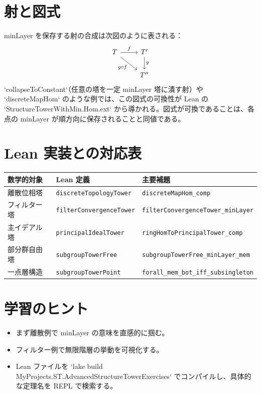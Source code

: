 \documentclass[a4paper]{ltjsarticle}
\theoremstyle{definition}
\theoremstyle{plain}
\theoremstyle{remark}
\begin{document}
\section{射と図式}
minLayer を保存する射の合成は次図のように表される：
\[
\begin{tikzcd}
T \arrow[r, "f"] \arrow[dr, "g \circ f"'] & T' \arrow[d, "g"] \\
& T''
\end{tikzcd}
\]
`collapseToConstant`（任意の塔を一定 minLayer 塔に潰す射）や `discreteMapHom` のような例では、この図式の可換性が Lean の `StructureTowerWithMin.Hom.ext` から導かれる。図式が可換であることは、各点の minLayer が順方向に保存されることと同値である。

\section{Lean 実装との対応表}
\begin{center}
\begin{tabular}{lll}
\toprule
数学的対象 & Lean 定義 & 主要補題 \\
\midrule
離散位相塔 & \verb|discreteTopologyTower| & \verb|discreteMapHom_comp| \\
フィルター塔 & \verb|filterConvergenceTower| & \verb|filterConvergenceTower_minLayer| \\
主イデアル塔 & \verb|principalIdealTower| & \verb|ringHomToPrincipalTower_comp| \\
部分群自由塔 & \verb|subgroupTowerFree| & \verb|subgroupTowerFree_minLayer_mem| \\
一点層構造 & \verb|subgroupTowerPoint| & \verb|forall_mem_bot_iff_subsingleton| \\
\bottomrule
\end{tabular}
\end{center}

\section{学習のヒント}
\begin{itemize}
  \item まず離散例で minLayer の意味を直感的に掴む。
  \item フィルター例で無限階層の挙動を可視化する。
  \item Lean ファイルを `lake build MyProjects.ST.AdvancedStructureTowerExercises` でコンパイルし、具体的な定理名を REPL で検索する。
\end{itemize}
\end{document}
